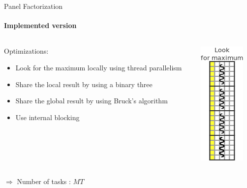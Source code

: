 \documentclass{beamer}
\begin{document}
\begin{frame}{Panel Factorization}
\framesubtitle{Implemented version}
\begin{columns}
\begin{column}{.70\textwidth}
Optimizations:
\begin{itemize}
\item Look for the maximum locally using thread parallelism
\item Share the local result by using a binary three
\item Share the global result by using Bruck's algorithm
\item Use internal blocking
\end{itemize}
\end{column}
\hfill
\begin{column}{.30\textwidth}
\begin{center}
\includegraphics[scale=0.8]{panel_max_opt1.png}
\end{center}
\end{column}
\end{columns}
\pause
\begin{exampleblock}{}
$\Longrightarrow$ Number of tasks : $MT$
\end{exampleblock}{}
\end{frame}
\end{document}
